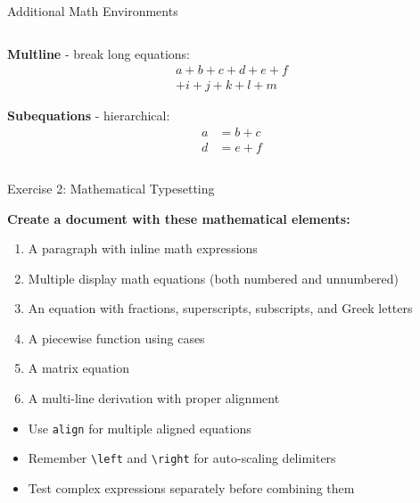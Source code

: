 \begin{frame}[fragile]{Additional Math Environments}
\begin{columns}
\begin{column}{0.5\textwidth}
            \textbf{Multline} - break long equations:
            \begin{multline}
                a + b + c + d + e + f \\
                + i + j + k + l + m
            \end{multline}
            
            \textbf{Subequations} - hierarchical:
            \begin{subequations}
                \begin{align}
                    a &= b + c\\
                    d &= e + f
                \end{align}
            \end{subequations}
        \end{column}
    \end{columns}
\end{frame}

\begin{frame}{Exercise 2: Mathematical Typesetting}
    \begin{practice}
        \textbf{Create a document with these mathematical elements:}
        \begin{enumerate}
            \item A paragraph with inline math expressions
            \item Multiple display math equations (both numbered and unnumbered)
            \item An equation with fractions, superscripts, subscripts, and Greek letters
            \item A piecewise function using cases
            \item A matrix equation
            \item A multi-line derivation with proper alignment
        \end{enumerate}
    \end{practice}
    
    \begin{tip}
        \begin{itemize}
            \item Use \texttt{align} for multiple aligned equations
            \item Remember \texttt{\textbackslash left} and \texttt{\textbackslash right} for auto-scaling delimiters
            \item Test complex expressions separately before combining them
        \end{itemize}
    \end{tip}
\end{frame}
